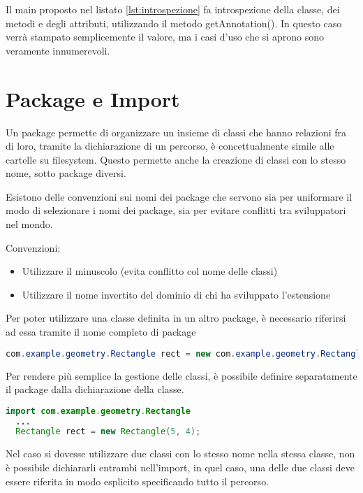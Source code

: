 \documentclass[a4paper,12pt,twoside]{book}
\begin{document}
Il main proposto nel listato \ref{lst:introspezione} fa introspezione
della classe, dei metodi e degli attributi, utilizzando il metodo
getAnnotation(). In questo caso verrà stampato semplicemente il
valore, ma i casi d'uso che si aprono sono veramente innumerevoli.

\section{Package e Import}

Un package permette di organizzare un insieme di classi che hanno
relazioni fra di loro, tramite la dichiarazione di un percorso, è
concettualmente simile alle cartelle su filesystem. Questo permette
anche la creazione di classi con lo stesso nome, sotto package
diversi.

Esistono delle convenzioni sui nomi dei package che servono sia per
uniformare il modo di selezionare i nomi dei package, sia per evitare
conflitti tra sviluppatori nel mondo.

Convenzioni:
\begin{itemize}
\item Utilizzare il minuscolo (evita conflitto col nome delle classi)
\item Utilizzare il nome invertito del dominio di chi ha sviluppato
  l'estensione
\end{itemize}

Per poter utilizzare una classe definita in un altro package, è
necessario riferirsi ad essa tramite il nome completo di package

\begin{lstlisting}[caption={}, label={}, language=Java]
  com.example.geometry.Rectangle rect = new com.example.geometry.Rectangle(5, 4);
\end{lstlisting}

Per rendere più semplice la gestione delle classi, è possibile
definire separatamente il package dalla dichiarazione della classe.

\begin{lstlisting}[caption={}, label={}, language=Java]
  import com.example.geometry.Rectangle
  ...
  Rectangle rect = new Rectangle(5, 4);
\end{lstlisting}


Nel caso si dovesse utilizzare due classi con lo stesso nome nella
stessa classe, non è possibile dichiararli entrambi nell'import, in
quel caso, una delle due classi deve essere riferita in modo esplicito
specificando tutto il percorso.
\end{document}
